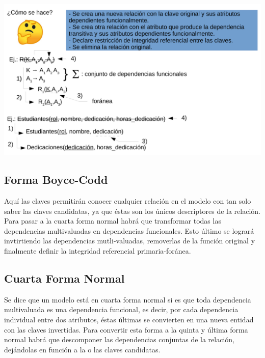 \documentclass[12pt]{article}
\begin{document}
\begin{center}
\includegraphics[scale=0.25]{3FN.png}
\end{center}

\subsection{Forma Boyce-Codd}
Aquí las claves permitirán conocer cualquier relación en el modelo con tan solo saber
las claves candidatas, ya que éstas son los únicos descriptores de la relación. Para 
pasar a la cuarta forma normal habrá que transformar todas las dependencias multivaluadas en 
dependencias funcionales. Esto último se logrará invtirtiendo las dependencias mutli-valuadas,
removerlas de la función original y finalmente definir la integridad referencial 
primaria-foránea.

\subsection{Cuarta Forma Normal}
Se dice que un modelo está en cuarta forma normal si es que toda dependencia multivaluada
es una dependencia funcional, es decir, por cada dependencia individual entre dos atributos,
éstas últimas se convierten en una nueva entidad con las claves invertidas. Para convertir
esta forma a la quinta y última forma normal habrá que descomponer las dependencias
conjuntas de la relación, dejándolas en función a la o las claves candidatas.
\end{document}
